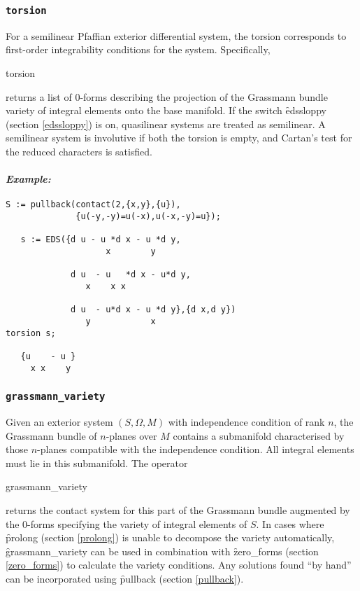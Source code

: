 \subsubsection{\tt torsion}
\label{torsion}

For a semilinear Pfaffian exterior differential system, the torsion
corresponds to first-order integrability conditions for the
system. Specifically,
\begin{edssyntax}
	torsion 
\end{edssyntax}
returns a list of 0-forms describing the projection of the Grassmann bundle
variety of integral elements onto the base manifold. If the switch
\f{edssloppy} (section \ref{edssloppy}) is on, quasilinear systems are
treated as semilinear. A semilinear system is involutive if both the
torsion is empty, and Cartan's test for the reduced characters is
satisfied.

\paragraph{\it Example:}
\begin{verbatim}
S := pullback(contact(2,{x,y},{u}),
              {u(-y,-y)=u(-x),u(-x,-y)=u});

   s := EDS({d u - u *d x - u *d y,
                    x        y 
   
             d u  - u   *d x - u*d y,
                x    x x 
   
             d u  - u*d x - u *d y},{d x,d y})
                y            x 
torsion s;

   {u    - u }
     x x    y 
\end{verbatim}

\subsubsection{\tt grassmann\_variety}
\label{grassmann_variety}

Given an exterior system $(S,\Omega,M)$ with independence condition of
rank $n$, the Grassmann bundle of $n$-planes over $M$ contains a
submanifold characterised by those $n$-planes compatible with the
independence condition. All integral elements must lie in this
submanifold. The operator
\begin{edssyntax}
	grassmann\_variety 
\end{edssyntax}
returns the contact system for this part of the Grassmann bundle augmented
by the 0-forms specifying the variety of integral elements of $S$. In cases
where \f{prolong} (section \ref{prolong}) is unable to decompose the
variety automatically, \f{grassmann\_variety} can be used in combination
with \f{zero\_forms} (section \ref{zero_forms}) to calculate the variety
conditions. Any solutions found ``by hand'' can be incorporated using
\f{pullback} (section \ref{pullback}).

